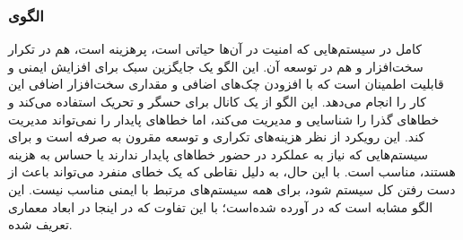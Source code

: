 \subsubsection{الگوی }
\label{archSafeProtectSingleChSec}
\begin{RTL}
 کامل در سیستم‌هایی که امنیت در آن‌ها حیاتی است،
پرهزینه است، هم در تکرار سخت‌افزار و هم در توسعه آن.
این الگو \cite{ref4}
یک جایگزین سبک برای افزایش ایمنی و قابلیت اطمینان است که با افزودن
چک‌های اضافی و مقداری سخت‌افزار اضافی این کار را انجام می‌دهد.
این الگو از یک کانال برای حسگر و تحریک استفاده می‌کند و خطاهای گذرا را
شناسایی و مدیریت می‌کند، اما خطاهای پایدار را نمی‌تواند مدیریت کند.
این رویکرد از نظر هزینه‌های تکراری و توسعه مقرون به صرفه است و برای سیستم‌هایی
که نیاز به عملکرد در حضور خطاهای پایدار ندارند یا حساس به هزینه هستند،
مناسب است. با این حال، به دلیل نقاطی که یک خطای منفرد می‌تواند باعث
از دست رفتن کل سیستم شود، برای همه سیستم‌های مرتبط با ایمنی مناسب نیست.
این الگو مشابه  است که
در \cite{ref1} آورده شده‌است؛ با این تفاوت که در اینجا در ابعاد معماری
تعریف شده.
\end{RTL}